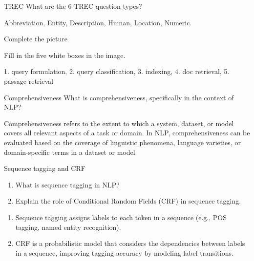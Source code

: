\documentclass{article}
\begin{document}
\begin{exercise}{TREC}\label{ex:trec}
  What are the 6 TREC question types?

  \begin{solution}
    Abbreviation, Entity, Description, Human, Location, Numeric.
  \end{solution}
\end{exercise}

\begin{exercise}{Complete the picture}
  

  Fill in the five white boxes in the image.

  \begin{solution}
    1. query formulation, 2. query classification, 3. indexing, 4. doc retrieval, 5. passage retrieval
  \end{solution}
\end{exercise}




\begin{exercise}{Comprehensiveness}
  What is comprehensiveness, specifically in the context of NLP?

  \begin{solution}
    Comprehensiveness refers to the extent to which a system, dataset, or model covers all relevant aspects of a task or domain.
    In NLP, comprehensiveness can be evaluated based on the coverage of linguistic phenomena, language varieties, or domain-specific terms in a dataset or model.
  \end{solution}
\end{exercise}

\begin{exercise}{Sequence tagging and CRF}\label{ex:seq-tagging}
  \begin{enumerate}
    \item What is sequence tagging in NLP?
    \item Explain the role of Conditional Random Fields (CRF) in sequence tagging.
  \end{enumerate}

  \begin{solution}
    \begin{enumerate}
        \item Sequence tagging assigns labels to each token in a sequence (e.g., POS tagging, named entity recognition).
        \item CRF is a probabilistic model that considers the dependencies between labels in a sequence, improving tagging accuracy by modeling label transitions.
    \end{enumerate}
  \end{solution}
\end{exercise}
\end{document}
